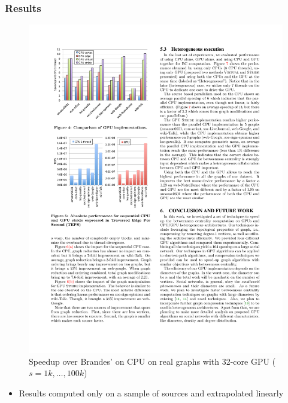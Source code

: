 \begin{frame}
  \frametitle{Results}

  \begin{figure}[t]
    \centering
    \includegraphics[width=\textwidth, height=0.6\textheight, keepaspectratio]{imgs/gpu-results1}
    \caption{Speedup over Brandes' on CPU on real graphs with 32-core GPU ($s= 1k, \ldots, 100k$)}
  \end{figure}

  \begin{itemize}
    \item Results computed only on a sample of sources and extrapolated linearly
  \end{itemize}
\end{frame}


%
%



